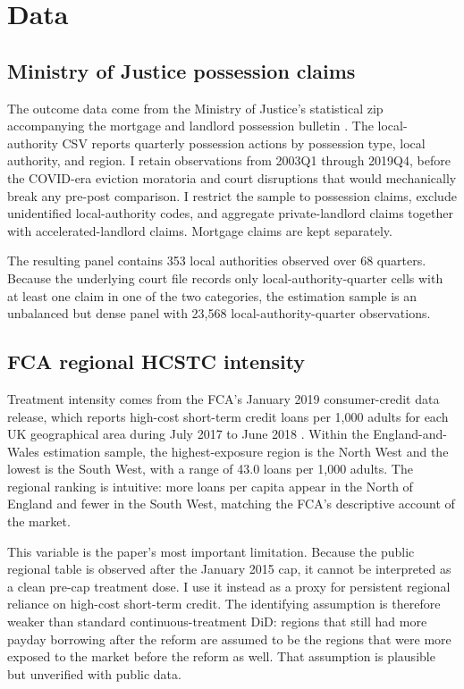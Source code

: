 \documentclass[12pt]{article}
\begin{document}
\section{Data}

\subsection{Ministry of Justice possession claims}
The outcome data come from the Ministry of Justice's statistical zip accompanying the mortgage and landlord possession bulletin \citep{moj2025possession}. The local-authority CSV reports quarterly possession actions by possession type, local authority, and region. I retain observations from 2003Q1 through 2019Q4, before the COVID-era eviction moratoria and court disruptions that would mechanically break any pre-post comparison. I restrict the sample to possession claims, exclude unidentified local-authority codes, and aggregate private-landlord claims together with accelerated-landlord claims. Mortgage claims are kept separately.

The resulting panel contains 353 local authorities observed over 68 quarters. Because the underlying court file records only local-authority-quarter cells with at least one claim in one of the two categories, the estimation sample is an unbalanced but dense panel with 23,568 local-authority-quarter observations.

\subsection{FCA regional HCSTC intensity}
Treatment intensity comes from the FCA's January 2019 consumer-credit data release, which reports high-cost short-term credit loans per 1,000 adults for each UK geographical area during July 2017 to June 2018 \citep{fca2019data}. Within the England-and-Wales estimation sample, the highest-exposure region is the North West and the lowest is the South West, with a range of 43.0 loans per 1,000 adults. The regional ranking is intuitive: more loans per capita appear in the North of England and fewer in the South West, matching the FCA's descriptive account of the market.

This variable is the paper's most important limitation. Because the public regional table is observed after the January 2015 cap, it cannot be interpreted as a clean pre-cap treatment dose. I use it instead as a proxy for persistent regional reliance on high-cost short-term credit. The identifying assumption is therefore weaker than standard continuous-treatment DiD: regions that still had more payday borrowing after the reform are assumed to be the regions that were more exposed to the market before the reform as well. That assumption is plausible but unverified with public data.
\end{document}
